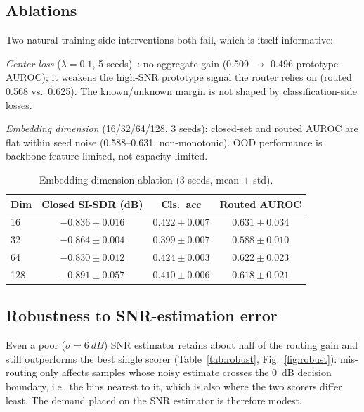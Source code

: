 \documentclass[review,12pt]{elsarticle}
\begin{document}
\subsection{Ablations}
\label{sec:ablations}

Two natural training-side interventions both fail, which is itself
informative:

\emph{Center loss} ($\lambda{=}0.1$, 5 seeds)~\cite{wen2016center}: no
aggregate gain (0.509 $\to$ 0.496 prototype AUROC); it weakens the
high-SNR prototype signal the router relies on (routed 0.568 vs.\
0.625). The known/unknown margin is not shaped by classification-side
losses.

\emph{Embedding dimension} (16/32/64/128, 3 seeds): closed-set and
routed AUROC are flat within seed noise (0.588--0.631, non-monotonic).
OOD performance is backbone-feature-limited, not capacity-limited.

\begin{table}[H]
\centering
\caption{Embedding-dimension ablation (3 seeds, mean $\pm$ std).}
\label{tab:embdim}
\begin{tabular}{lccc}
\toprule
Dim & Closed SI-SDR (dB) & Cls.\ acc & Routed AUROC \\
\midrule
16  & $-0.836 \pm 0.016$ & $0.422 \pm 0.007$ & $0.631 \pm 0.034$ \\
32  & $-0.864 \pm 0.004$ & $0.399 \pm 0.007$ & $0.588 \pm 0.010$ \\
64  & $-0.830 \pm 0.012$ & $0.424 \pm 0.003$ & $0.622 \pm 0.023$ \\
128 & $-0.891 \pm 0.057$ & $0.410 \pm 0.006$ & $0.618 \pm 0.021$ \\
\bottomrule
\end{tabular}
\end{table}

\subsection{Robustness to SNR-estimation error}
\label{sec:robust}

Even a poor ($\sigma = \SI{6}{dB}$) SNR estimator retains about half of
the routing gain and still outperforms the best single scorer
(Table~\ref{tab:robust}, Fig.~\ref{fig:robust}): mis-routing
only affects samples whose noisy estimate crosses the \SI{0}{dB}
decision boundary, i.e.\ the bins nearest to it, which is also where the
two scorers differ least. The demand placed on the SNR estimator is
therefore modest.
\end{document}
